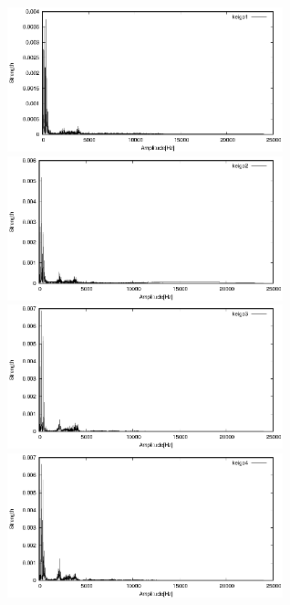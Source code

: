 \documentclass[titlepage]{jarticle}
\begin{document}
\begin{figure}[H]
  \begin{minipage}{0.495\hsize}
    \centering
    \includegraphics[width=8cm]{img/keigo1.eps}
    \caption{}
    \label{keigo1}
  \end{minipage}
  \begin{minipage}{0.495\hsize}
    \centering
    \includegraphics[width=8cm]{img/keigo2.eps}
    \caption{}
    \label{keigo2}
  \end{minipage}


  \begin{minipage}{0.495\hsize}
    \centering
    \includegraphics[width=8cm]{img/keigo3.eps}
    \caption{}
    \label{keigo3}
  \end{minipage}
  \begin{minipage}{0.495\hsize}
    \centering
    \includegraphics[width=8cm]{img/keigo4.eps}
    \caption{}
    \label{keigo4}
  \end{minipage}
\end{figure}
\end{document}
